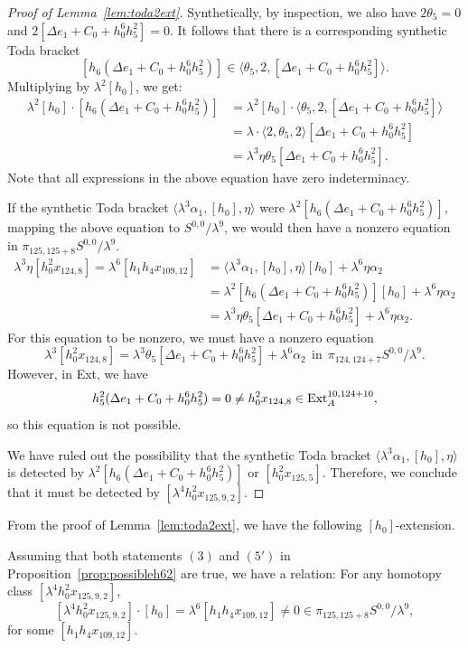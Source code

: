 \documentclass{amsart}
\numberwithin{equation}{section}
\begin{document}
\begin{proof}[Proof of Lemma~\ref{lem:toda2ext}]
Synthetically, by inspection, we also have $2\theta_5=0$ and $2 [\Delta e_1 +C_0+h_0^6h_5^2] = 0$. It follows that there is a corresponding synthetic Toda bracket
$$[h_6(\Delta e_1 +C_0+h_0^6h_5^2)] \in \langle \theta_5, 2, [\Delta e_1 +C_0+h_0^6h_5^2] \rangle.$$
Multiplying by $\lambda^2 [h_0]$, we get:
\begin{align*}
    \lambda^2 [h_0] \cdot [h_6(\Delta e_1 +C_0+h_0^6h_5^2)]& = \lambda^2 [h_0] \cdot \langle \theta_5, 2, [\Delta e_1 +C_0+h_0^6h_5^2] \rangle \\
    & = \lambda \cdot \langle 2, \theta_5, 2 \rangle [\Delta e_1 +C_0+h_0^6h_5^2]\\
    & = \lambda^3 \eta \theta_5 [\Delta e_1 +C_0+h_0^6h_5^2].
\end{align*}
Note that all expressions in the above equation have zero indeterminacy. 

If the synthetic Toda bracket $\langle \lambda^3 \alpha_1, [h_0], \eta \rangle$ were $\lambda^2 [h_6(\Delta e_1 +C_0+h_0^6h_5^2)]$, mapping the above equation to $S^{0,0}/\lambda^9$, we would then have a nonzero equation in $\pi_{125,125+8} S^{0,0}/\lambda^9$.
\begin{align*}
    \lambda^3 \eta [h_0^2 x_{124,8}] = \lambda^6 [h_1h_4x_{109,12}] & = \langle \lambda^3 \alpha_1, [h_0], \eta \rangle [h_0] + \lambda^6 \eta \alpha_2 \\ & = \lambda^2 [h_6(\Delta e_1 +C_0+h_0^6h_5^2)] [h_0] + \lambda^6 \eta \alpha_2\\ & = \lambda^3 \eta \theta_5 [\Delta e_1 +C_0+h_0^6h_5^2] + \lambda^6 \eta \alpha_2.
\end{align*}
For this equation to be nonzero, we must have a nonzero equation
$$\lambda^3 [h_0^2 x_{124,8}] = \lambda^3 \theta_5 [\Delta e_1 +C_0+h_0^6h_5^2] + \lambda^6 \alpha_2 \ \ \text{in} \ \ \pi_{124,124+7} S^{0,0}/\lambda^9.$$
However, in Ext, we have 
$$h_5^2 (\Delta e_1 +C_0+h_0^6h_5^2) = 0 \neq h_0^2 x_{124,8} \in \mathrm{Ext}_A^{10,124+10},$$
so this equation is not possible.


We have ruled out the possibility that the synthetic Toda bracket $\langle \lambda^3 \alpha_1, [h_0], \eta \rangle$ is detected by $\lambda^2 [h_6(\Delta e_1 +C_0+h_0^6h_5^2)]$ or $[h_0^2 x_{125,5}]$. Therefore, we conclude that it must be detected by $[\lambda^4 h_0^2 x_{125,9,2}]$.
\end{proof}

From the proof of Lemma~\ref{lem:toda2ext}, we have the following $[h_0]$-extension.

\begin{corollary} \label{cor:2ext125}
    Assuming that both statements $(3)$ and $(5')$ in Proposition~\ref{prop:possibleh62} are true, we have a relation: For any homotopy class $[\lambda^4 h_0^2x_{125,9,2}]$,
    $$[\lambda^4 h_0^2x_{125,9,2}] \cdot [h_0] = \lambda^6 [h_1h_4x_{109,12}] \neq 0 \in \pi_{125,125+8} S^{0,0}/\lambda^9,$$
    for some $[h_1h_4x_{109,12}]$.
\end{corollary}
\end{document}
